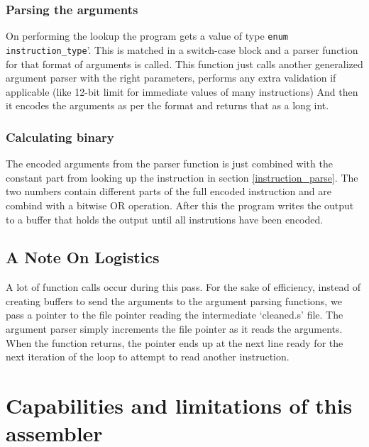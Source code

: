 \documentclass[12pt]{article}
\begin{document}
			\subsubsection{Parsing the arguments}
			On performing the lookup the program gets a value of type \verb|enum instruction_type|'. This is matched in a switch-case block and a parser function for that format of arguments is called.
			This function just calls another generalized argument parser with the right parameters, performs any extra validation if applicable (like 12-bit limit for immediate values of many instructions)
			And then it encodes the arguments as per the format and returns that as a long int.

			\subsubsection{Calculating binary}
			The encoded arguments from the parser function is just combined with the constant part from looking up the instruction in section \ref{instruction_parse}. The two numbers contain different parts of the full encoded instruction and are combind with a bitwise OR operation.
			After this the program writes the output to a buffer that holds the output until all instrutions have been encoded.

			\subsection{A Note On Logistics}
			A lot of function calls occur during this pass. For the sake of efficiency, instead of creating buffers to send the arguments to the argument parsing functions, we pass a pointer to the file pointer reading the intermediate `cleaned.s' file. The argument parser simply increments the file pointer as it reads the arguments. When the function returns, the pointer ends up at the next line ready for the next iteration of the loop to attempt to read another instruction.

	\section{Capabilities and limitations of this assembler}
\end{document}
